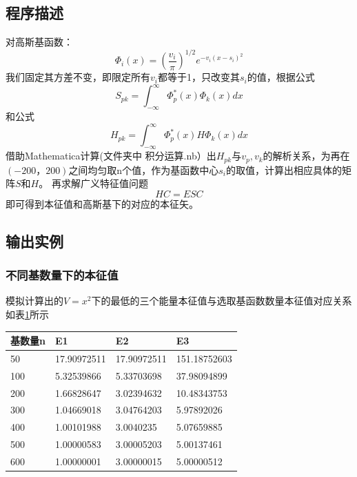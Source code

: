 \documentclass[11pt]{article}
\begin{document}
\subsection{程序描述}
对高斯基函数：
\begin{equation}
    \Phi_i(x)=(\frac{v_i}{\pi})^{1/2}e^{-v_i(x-s_i)^2}
\end{equation}
我们固定其方差不变，即限定所有$v_i$都等于1，只改变其$s_i$的值，根据公式
\begin{equation}
   S_{pk} = \int_{-\infty}^\infty\Phi_p^*(x)\Phi_k(x)dx
\end{equation}
和公式
\begin{equation}
    H_{pk}=\int_{-\infty}^{\infty}\Phi_{p}^{*}(x)H\Phi_{k}(x)dx
\end{equation}
借助Mathematica计算(文件夹中 积分运算.nb）出$H_{pk}$与$v_p,v_k$的解析关系，为再在$(-200，200)$之间均匀取n个值，作为基函数中心$s_i$的取值，计算出相应具体的矩阵$S$和$H$。
再求解广义特征值问题
\begin{equation}
    HC =ESC
\end{equation}
即可得到本征值和高斯基下的对应的本征矢。

\subsection{输出实例}
\subsubsection{不同基数量下的本征值}
模拟计算出的$V=x^2$下的最低的三个能量本征值与选取基函数数量本征值对应关系如表\ref{本征值与基函数数量对应关系}所示

\begin{table}[!ht]
\label{本征值与基函数数量对应关系}
    \centering
    \begin{tabular}{|l|l|l|l|}
    \hline
        \textbf{基数量n} & \textbf{E1} & \textbf{E2} & \textbf{E3} \\ \hline
        50 & 17.90972511 & 17.90972511 & 151.18752603 \\ \hline
        100 &  5.32539866 & 5.33703698 & 37.98094899 \\ \hline
        200 & 1.66828647 & 3.02394632 & 10.48343753 \\ \hline
        300 & 1.04669018  & 3.04764203  & 5.97892026 \\ \hline
        400 & 1.00101988  & 3.0040235   & 5.07659885 \\ \hline
        500 & 1.00000583  & 3.00005203  & 5.00137461 \\ \hline
        600 & 1.00000001 & 3.00000015 & 5.00000512 \\ \hline
    \end{tabular}
\end{table}
\end{document}
